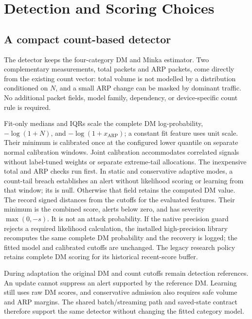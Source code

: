 \section{Detection and Scoring Choices}
\label{sec:detector-scoring}

\subsection{A compact count-based detector}

The detector keeps the four-category DM and Minka estimator. Two complementary
measurements, total packets and ARP packets, come directly from the existing
count vector: total volume is not modelled by a distribution conditioned on
$N$, and a small ARP change can be masked by dominant traffic. No additional
packet fields, model family, dependency, or device-specific count rule is
required.

Fit-only medians and IQRs scale the complete DM log-probability,
$-\log(1+N)$, and $-\log(1+x_{\mathrm{ARP}})$; a constant fit feature uses unit
scale. Their minimum is calibrated once at the configured lower quantile on
separate normal calibration windows. Joint calibration accommodates correlated
signals without label-tuned weights or separate extreme-tail allocations.
The inexpensive total and ARP checks run first. In static and conservative
adaptive modes, a count-tail breach establishes an alert without likelihood
scoring or learning from that window; its
 is null. Otherwise that field retains the computed DM
value. The  record signed distances from the cutoffs for
the evaluated features. Their minimum is the combined score, alerts below zero,
and has severity $\max(0,-s)$. It is not an attack probability. If the native
precision guard rejects a required likelihood calculation, the installed
high-precision library recomputes the same complete DM probability and the
recovery is logged; the fitted model and calibrated cutoffs are unchanged.
The legacy research policy retains complete DM scoring for its historical
recent-score buffer.

During adaptation the original DM and count cutoffs remain detection
references. An update cannot suppress an alert supported by the reference DM.
Learning still uses raw DM scores, and conservative admission also requires
safe volume and ARP margins. The shared batch/streaming path and saved-state
contract therefore support the same detector without changing the fitted
category model.

